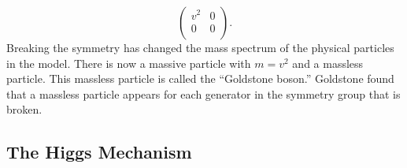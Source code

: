 \begin{equation}
  \left(
  \begin{array}{cc}
    v^2 & 0 \\
    0 & 0 \\
  \end{array}
  \right).
  \nonumber
\end{equation}
Breaking the symmetry has changed the mass spectrum of the physical particles in
the model.  There is now a massive particle with $m=v^2$ and a massless
particle.  This massless particle is called the ``Goldstone boson.''
 Goldstone found~\cite{Goldstone:1961eq} that a massless
particle appears for each generator in the symmetry group that is broken.

\subsection{The Higgs Mechanism}
\label{sec:HiggsMech}

